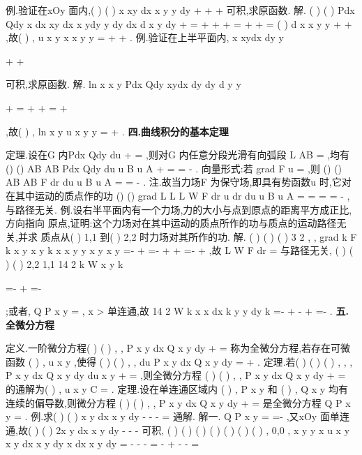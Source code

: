 \textcolor{lyred}{例}.验证在xOy 面内,(
)
(
)
x
xy
dx
x y
y
dy
+
+
+
可积,求原函数. 
解.
(
)
(
)
Pdx
Qdy
x dx
xy dx
x ydy
y dy
dx
d
x y
dy
+
=
+
+
+
=
+
+
= 
(
)
d x
x y
y
+
+
,故(
)
,
u x y
x
x y
y
=
+
+
. 
\textcolor{lyred}{例}.验证在上半平面内,
x
xydx
dy
y


+
+




可积,求原函数. 
解.
ln
x
x y
Pdx
Qdy
xydx
dy
dy
d
y
y


+
=
+
+
=
+




,故(
)
,
ln
x y
u x y
y
=
+
. 
\vspace{4pt}
{\bfseries \textcolor{lyred}{四.曲线积分的基本定理}}

\textcolor{lyred}{定理}.设在G 内Pdx
Qdy
du
+
=
,则对G 内任意分段光滑有向弧段
\approx 
L
AB
=
,均有 
\approx 
\approx 
()
()
AB
AB
Pdx
Qdy
du
u B
u A
+
=
=
-
\int 
\int 
. 
\textcolor{lyred}{向量形式}:若
grad
F
u
=
\rho 
,则
\approx 
\approx 
()
()
AB
AB
F dr
du
u B
u A
\cdots 
=
=
-
\int 
\int 
\rho 
\rho 
. 
\textcolor{lyred}{注}.故当力场F
\xi \rho 
为保守场,即具有势函数u 时,它对在其中运动的质点作的功 
()
()
grad
L
L
L
W
F dr
u dr
du
u B
u A
=
\cdots 
=
\cdots 
=
=
-
\int 
\int 
\int 
\xi \rho 
\rho 
\rho 
,与路径无关. 
\textcolor{lyred}{例}.设右半平面内有一个力场,力的大小与点到原点的距离平方成正比,方向指向 
原点,证明:这个力场对在其中运动的质点所作的功与质点的运动路径无关,并求 
质点从(
)
1,1 到(
)
2,2 时力场对其所作的功. 
解.
(
)
(
)
(
)
3 2
,
,
grad
k
F
k
x
y
x y
k x x
y
y x
y
x
y
=-
+
=-
+
+
=-
+
\xi \rho 
,故 
L
W
F dr
=
\cdots 
\int 
\rho 
\rho 与路径无关,
(
)
(
)
(
)
2,2
1,1
14 2
k
W
x
y
k


=-
+
=-




;或者, 
Q
P
x
y
\partial 
\partial 
=
\partial 
\partial ,
x >
单连通,故
14 2
W
k x x
dx
k y
y dy
k
=-
+
-
+
=-
\int 
\int 
. 
\vspace{4pt}
{\bfseries \textcolor{lyred}{五.全微分方程}}

\textcolor{lyred}{定义}.一阶微分方程(
)
(
)
,
,
P x y dx
Q x y dy
+
=
称为\textcolor{lyred}{全微分方程},若存在可微函数 
(
)
,
u x y ,使得
(
)
(
)
,
,
du
P x y dx
Q x y dy
=
+
. 
\textcolor{lyred}{定理}.若(
)
(
)
(
)
,
,
,
P x y dx
Q x y dy
du x y
+
=
,则全微分方程 
(
)
(
)
,
,
P x y dx
Q x y dy
+
=
的通解为(
)
,
u x y
C
=
. 
\textcolor{lyred}{定理}.设在单连通区域内
(
)
,
P x y 和
(
)
,
Q x y 均有连续的偏导数,则微分方程 
(
)
(
)
,
,
P x y dx
Q x y dy
+
=
是全微分方程
Q
P
x
y
\partial 
\partial 
\Leftrightarrow 
=
\partial 
\partial . 
\textcolor{lyred}{例}.求(
)
(
)
x
y dx
x
y dy
-
-
-
=
通解. 
解一.
Q
P
x
y
\partial 
\partial 
=
=-
\partial 
\partial 
,又xOy 面单连通,故(
)
(
)
2x
y dx
x
y dy
-
-
-
可积, 
(
)
(
)
(
)
(
)
(
)
(
)
(
)
,
0,0
,
x y
y
x
u x y
x
y dx
x
y dy
x
dx
x
y
dy
=
-
-
-
=
-
+
-
-
=




